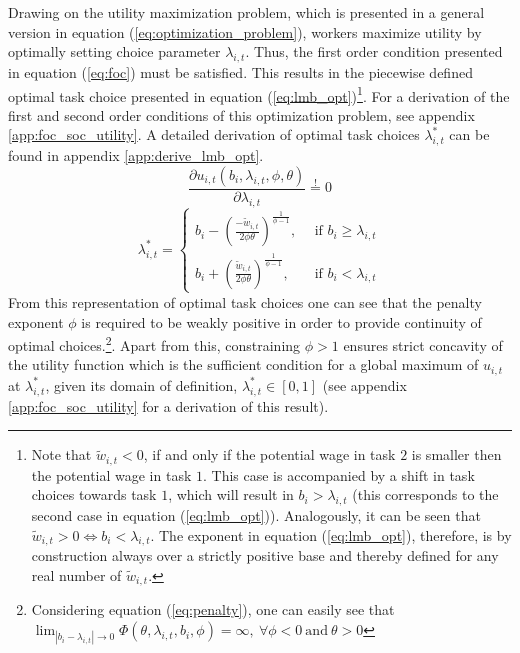 \documentclass[../main.tex]{subfiles}
\begin{document}
Drawing on the utility maximization problem, which is presented in a general version in equation (\ref{eq:optimization_problem}), workers maximize utility by optimally setting choice parameter $\lambda_{i,t}$. Thus, the first order condition presented in equation (\ref{eq:foc}) must be satisfied. This results in the piecewise defined optimal task choice presented in equation (\ref{eq:lmb_opt})\footnote{Note that $\tilde{w}_{i,t} < 0$, if and only if the potential wage in task $2$ is smaller then the potential wage in task $1$. This case is accompanied by a shift in task choices towards task $1$, which will result in $b_i > \lambda_{i,t}$ (this corresponds to the second case in equation (\ref{eq:lmb_opt})).  Analogously, it can be seen that $\tilde{w}_{i,t} > 0 \iff b_i < \lambda_{i,t}$. The exponent in equation (\ref{eq:lmb_opt}), therefore, is by construction always over a strictly positive base and thereby defined for any real number of $\tilde{w}_{i,t}$.}. For a derivation of the first and second order conditions of this optimization problem, see appendix \ref{app:foc_soc_utility}. A detailed derivation of optimal task choices $\lambda_{i,t}^*$ can be found in appendix \ref{app:derive_lmb_opt}. 
\begin{equation} \label{eq:foc}
	\frac{\partial u_{i,t}(b_i, \lambda_{i,t}, \phi, \theta)}{\partial \lambda_{i,t}} \overset{!}{=} 0
\end{equation}
\begin{equation} \label{eq:lmb_opt}
	\lambda^*_{i,t} = \left\{
	\begin{array}{ll}
		b_i - (\frac{- \tilde{w}_{i,t}}{2 \phi \theta})^{\frac{1}{\phi -1}}, \: & \: \text{if $b_i \geq \lambda_{i,t}$}\\
		b_i + (\frac{\tilde{w}_{i,t}}{2 \phi \theta})^{\frac{1}{\phi - 1}}, \: & \: \text{if $b_i < \lambda_{i,t}$}
	\end{array}
\right.
\end{equation}
From this representation of optimal task choices one can see that the penalty exponent $\phi$ is required to be weakly positive in order to provide continuity of optimal choices.\footnote{Considering equation (\ref{eq:penalty}), one can easily see that $\lim_{|b_i - \lambda_{i,t}|\to 0} \Phi (\theta, \lambda_{i,t}, b_i, \phi) = \infty, \: \forall \phi < 0 \: \text{and} \: \theta > 0$}. Apart from this, constraining $\phi > 1$ ensures strict concavity of the utility function which is the sufficient condition for a global maximum of $u_{i,t}$ at $\lambda_{i,t}^*$, given its domain of definition, $\lambda_{i,t}^* \in [0,1]$ (see appendix \ref{app:foc_soc_utility} for a derivation of this result). 
\end{document}

